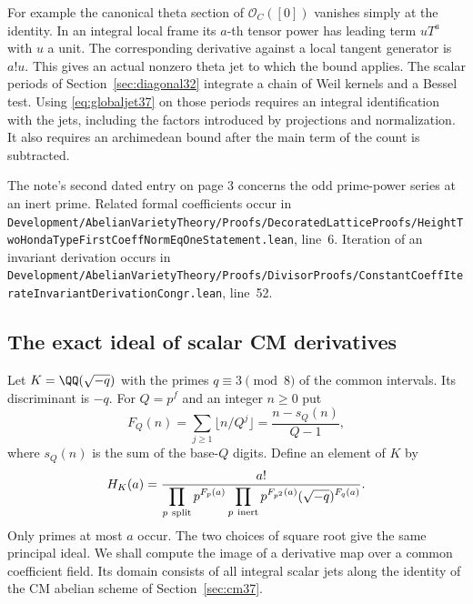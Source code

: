 \documentclass[a4paper,11pt]{article}
\theoremstyle{definition}
\theoremstyle{remark}
\newcommand{\lead}[1]{\par\smallskip\noindent{\bfseries\color{ink}#1.}\enspace}
\newcommand{\srcloc}[2]{{\small\nolinkurl{#1.lean}}, line~#2}
\numberwithin{equation}{section}
\begin{document}
For example the canonical theta section of \(\mathcal O_C([0])\) vanishes simply at the identity. In an integral local frame its \(a\)-th tensor power has leading term \(uT^a\) with \(u\) a unit. The corresponding derivative against a local tangent generator is \(a!u\). This gives an actual nonzero theta jet to which the bound applies. The scalar periods of Section~\ref{sec:diagonal32} integrate a chain of Weil kernels and a Bessel test. Using \eqref{eq:globaljet37} on those periods requires an integral identification with the jets, including the factors introduced by projections and normalization. It also requires an archimedean bound after the main term of the count is subtracted.

\lead{Locations in the accompanying source} The note's second dated entry on page 3 concerns the odd prime-power series at an inert prime. Related formal coefficients occur in \srcloc{Development/AbelianVarietyTheory/Proofs/DecoratedLatticeProofs/HeightTwoHondaTypeFirstCoeffNormEqOneStatement}{6}. Iteration of an invariant derivation occurs in \srcloc{Development/AbelianVarietyTheory/Proofs/DivisorProofs/ConstantCoeffIterateInvariantDerivationCongr}{52}.

\subsection{The exact ideal of scalar CM derivatives}\label{nav:V-04}
\label{sec:exact41}

Let \(K=\QQ(\sqrt{-q})\) with the primes \(q\equiv3\pmod8\) of the common intervals. Its discriminant is \(-q\). For \(Q=p^f\) and an integer \(n\ge0\) put
\[
       F_Q(n)=\sum_{j\ge1}\lfloor n/Q^j\rfloor
             =\frac{n-s_Q(n)}{Q-1},
\]
where \(s_Q(n)\) is the sum of the base-\(Q\) digits. Define an element of \(K\) by
\begin{equation}
 H_K(a)=\frac{a!}{
  \displaystyle\prod_{p\ {\rm split}}p^{F_p(a)}
  \prod_{p\ {\rm inert}}p^{F_{p^2}(a)}
  (\sqrt{-q})^{F_q(a)}} .                                    \label{eq:generator41}
\end{equation}
Only primes at most \(a\) occur. The two choices of square root give the same principal ideal. We shall compute the image of a derivative map over a common coefficient field. Its domain consists of all integral scalar jets along the identity of the CM abelian scheme of Section~\ref{sec:cm37}.
\end{document}
